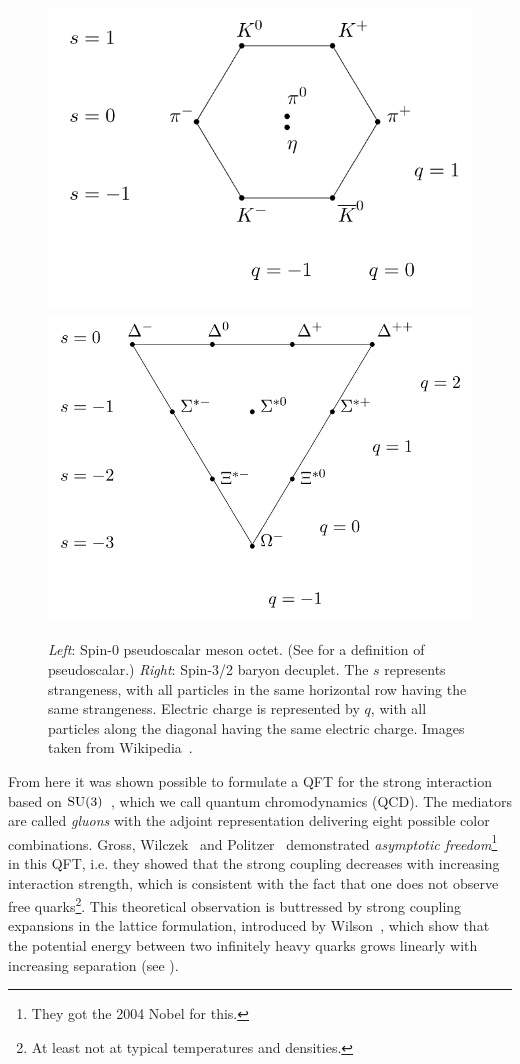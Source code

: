 \begin{figure}[t]
  \centering
  \includegraphics[width=0.48\linewidth]{figs/Meson_octet.png}
  \includegraphics[width=0.48\linewidth]{figs/Baryon_decuplet.png}
  \caption{{\it Left}: Spin-0 pseudoscalar meson octet. (See
            for a definition of
           pseudoscalar.) {\it Right}:
           Spin-3/2 baryon decuplet. The $s$ represents strangeness,
           with all particles in the same horizontal row having the
           same strangeness. Electric charge is represented by $q$,
           with all particles along the diagonal having the same
           electric charge. Images taken from
           Wikipedia~\cite{wiki_eightfold}.}
  \label{fig:eightfold}
\end{figure}

From here it was shown possible to formulate a QFT for the strong interaction
based on $\operatorname{SU}(3)$~\cite{fritzsch_advantages_1973}, which we
call quantum chromodynamics (QCD).
The mediators are called
{\it gluons} with the adjoint representation delivering
eight possible color combinations.
Gross, Wilczek~\cite{gross_d.j._ultraviolet_1973} and
Politzer~\cite{politzer_reliable_1973} demonstrated
{\it asymptotic freedom}\footnote{They got the 2004 Nobel for this.}
 in this QFT, i.e. they showed that the
strong coupling decreases with increasing interaction strength, which is
consistent with the fact that one does not observe free quarks\footnote{At
least not at typical temperatures and densities.}.
This theoretical observation is buttressed by strong coupling
expansions in the lattice formulation, introduced by 
Wilson~\cite{wilson_confinement_1974}, which show that the potential
energy between two infinitely heavy quarks grows linearly with
increasing separation
(see ).

